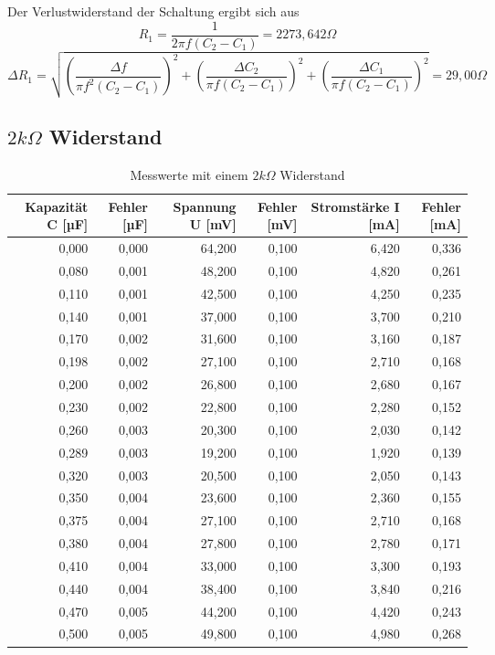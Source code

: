 Der Verlustwiderstand der Schaltung ergibt sich aus
\begin{equation}
R_1= \frac{1}{2\pi f (C_2-C_1)}=2273,642\Omega
\end{equation}
\begin{equation}
\Delta R_1 = \sqrt{ \left( \dfrac{\Delta f}{\pi f^2 (C_2 - C_1)} \right)^2 + \left( \dfrac{\Delta C_2}{\pi f (C_2 - C_1)} \right)^2 + \left( \dfrac{\Delta C_1}{\pi f (C_2 - C_1)} \right)^2}=29,00\Omega
\end{equation}

\subsection{$2k\Omega$ Widerstand}
\begin{table}[]
  \centering
 
    \begin{tabular}{rrrrrr}
    \toprule
    Kapazität C [µF] & Fehler [µF] & Spannung U [mV] & Fehler [mV] & Stromstärke I [mA] & Fehler [mA] \\
    \midrule
    0,000 & 0,000 & 64,200 & 0,100 & 6,420 & 0,336 \\
    0,080 & 0,001 & 48,200 & 0,100 & 4,820 & 0,261 \\
    0,110 & 0,001 & 42,500 & 0,100 & 4,250 & 0,235 \\
    0,140 & 0,001 & 37,000 & 0,100 & 3,700 & 0,210 \\
    0,170 & 0,002 & 31,600 & 0,100 & 3,160 & 0,187 \\
    0,198 & 0,002 & 27,100 & 0,100 & 2,710 & 0,168 \\
    0,200 & 0,002 & 26,800 & 0,100 & 2,680 & 0,167 \\
    0,230 & 0,002 & 22,800 & 0,100 & 2,280 & 0,152 \\
    0,260 & 0,003 & 20,300 & 0,100 & 2,030 & 0,142 \\
    0,289 & 0,003 & 19,200 & 0,100 & 1,920 & 0,139 \\
    0,320 & 0,003 & 20,500 & 0,100 & 2,050 & 0,143 \\
    0,350 & 0,004 & 23,600 & 0,100 & 2,360 & 0,155 \\
    0,375 & 0,004 & 27,100 & 0,100 & 2,710 & 0,168 \\
    0,380 & 0,004 & 27,800 & 0,100 & 2,780 & 0,171 \\
    0,410 & 0,004 & 33,000 & 0,100 & 3,300 & 0,193 \\
    0,440 & 0,004 & 38,400 & 0,100 & 3,840 & 0,216 \\
    0,470 & 0,005 & 44,200 & 0,100 & 4,420 & 0,243 \\
    0,500 & 0,005 & 49,800 & 0,100 & 4,980 & 0,268 \\
    \bottomrule
    \end{tabular}
  \label{tab:addlabel}
   \caption{Messwerte mit einem $2 k\Omega$ Widerstand}
\end{table}

